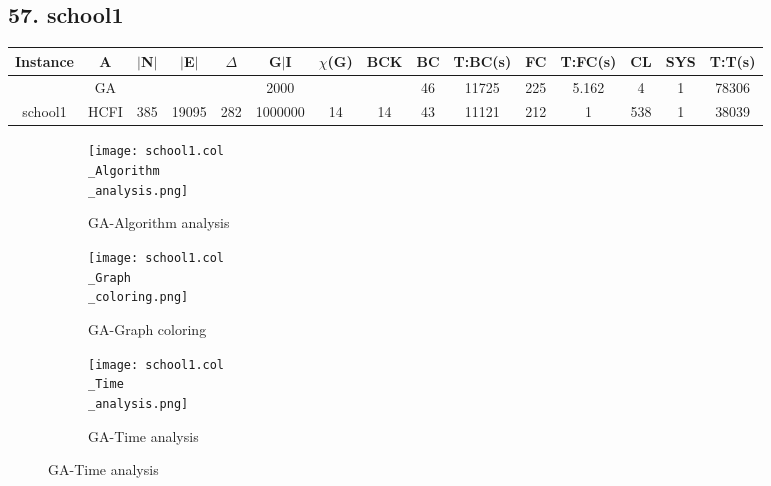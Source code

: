 \documentclass[10pt]{article}
\begin{document}
\subsection*{\hspace{0,9073976cm} 57. school1}
\begin{table}[H]
\centering
\begin{tabular}{|c|c|c|c|c|c|c|c|c|c|c|c|c|c|c|}
\hline
Instance& A &$|$N$|$ & $|$E$|$ & $\Delta$ & G$|$I & $\chi$(G) &BCK&BC & T:BC(s) & FC & T:FC(s) & CL & SYS & T:T(s) \\ \hline \hline

&GA&       &                   &                     &    2000     &     \cellcolor{yellow} & {\cellcolor{yellow}}& {{\cellcolor{green}46}}
&11725   &225        &5.162                   &4                    &1          &78306         \\ \cline{2-2} \cline{6-6} \cline{9-15}
 \multirow{-2}{*}{school1} &HCFI   &\multirow{-2}{*}{385}   &\multirow{-2}{*}{19095}     &\multirow{-2}{*}{282}     &1000000     &\multirow{-2}{*}{\cellcolor{yellow}14}      & \multirow{-2}{*}{\cellcolor{yellow}14}    &{\cellcolor{green}43}     &11121         &212    &1         &538    &1     &38039       \\ \hline
\end{tabular}
\end{table}
\graphicspath{{./Core1/Solutions/GA/school1.col}}
\begin{figure}[H]
\begin{subfigure}{.33\textwidth}
  \centering
  \texttt{[image: school1.col\\\_Algorithm\\\_analysis.png]}
  \caption{GA-Algorithm analysis}
   \label{fig:subfig1}
\end{subfigure}%
\begin{subfigure}{.33\textwidth}
  \centering
  \texttt{[image: school1.col\\\_Graph\\\_coloring.png]}
  \caption{GA-Graph coloring}
  \label{fig:subfig2}
\end{subfigure}
\begin{subfigure}{.33\textwidth}
  \centering
  \texttt{[image: school1.col\\\_Time\\\_analysis.png]}
  \caption{GA-Time analysis}
  \end{subfigure}
\end{figure}
\end{document}
